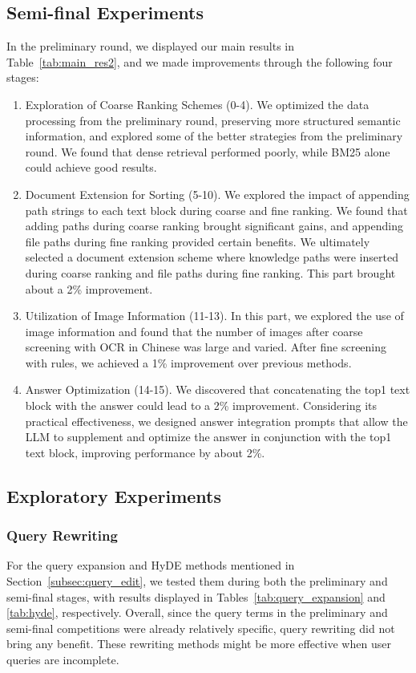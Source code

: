 \documentclass[11pt]{article}
\begin{document}
\subsection{Semi-final Experiments}
In the preliminary round, we displayed our main results in Table~\ref{tab:main_res2}, and we made improvements through the following four stages:
\begin{enumerate}
    \item Exploration of Coarse Ranking Schemes (0-4). We optimized the data processing from the preliminary round, preserving more structured semantic information, and explored some of the better strategies from the preliminary round. We found that dense retrieval performed poorly, while BM25 alone could achieve good results.
    \item Document Extension for Sorting (5-10). We explored the impact of appending path strings to each text block during coarse and fine ranking. We found that adding paths during coarse ranking brought significant gains, and appending file paths during fine ranking provided certain benefits. We ultimately selected a document extension scheme where knowledge paths were inserted during coarse ranking and file paths during fine ranking. This part brought about a 2\% improvement.
    \item Utilization of Image Information (11-13). In this part, we explored the use of image information and found that the number of images after coarse screening with OCR in Chinese was large and varied. After fine screening with rules, we achieved a 1\% improvement over previous methods.
    \item Answer Optimization (14-15). We discovered that concatenating the top1 text block with the answer could lead to a 2\% improvement. Considering its practical effectiveness, we designed answer integration prompts that allow the LLM to supplement and optimize the answer in conjunction with the top1 text block, improving performance by about 2\%.
\end{enumerate}

\subsection{Exploratory Experiments}
\subsubsection{Query Rewriting}
For the query expansion and HyDE methods mentioned in Section~\ref{subsec:query_edit}, we tested them during both the preliminary and semi-final stages, with results displayed in Tables~\ref{tab:query_expansion} and \ref{tab:hyde}, respectively. Overall, since the query terms in the preliminary and semi-final competitions were already relatively specific, query rewriting did not bring any benefit. These rewriting methods might be more effective when user queries are incomplete.
\end{document}

